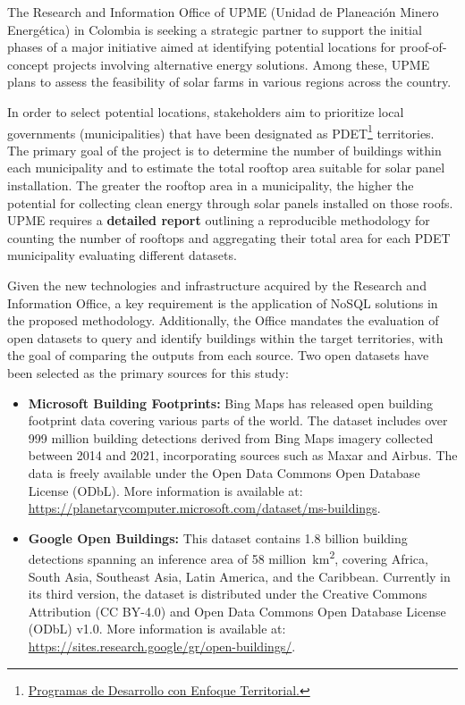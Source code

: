 \documentclass[12pt]{article}
\begin{document}
The Research and Information Office of UPME (Unidad de Planeación Minero Energética) in Colombia is seeking a strategic partner to support the initial phases of a major initiative aimed at identifying potential locations for proof-of-concept projects involving alternative energy solutions. Among these, UPME plans to assess the feasibility of solar farms in various regions across the country.

In order to select potential locations, stakeholders aim to prioritize local governments (municipalities) that have been designated as PDET\footnote{\href{https://centralpdet.renovacionterritorio.gov.co/conoce-los-pdet/}{Programas de Desarrollo con Enfoque Territorial.}} territories. The primary goal of the project is to determine the number of buildings within each municipality and to estimate the total rooftop area suitable for solar panel installation. The greater the rooftop area in a municipality, the higher the potential for collecting clean energy through solar panels installed on those roofs. UPME requires a \textbf{detailed report} outlining a reproducible methodology for counting the number of rooftops and aggregating their total area for each PDET municipality evaluating different datasets.

Given the new technologies and infrastructure acquired by the Research and Information Office, a key requirement is the application of NoSQL solutions in the proposed methodology. Additionally, the Office mandates the evaluation of open datasets to query and identify buildings within the target territories, with the goal of comparing the outputs from each source. Two open datasets have been selected as the primary sources for this study:

\begin{itemize}
  \item \textbf{Microsoft Building Footprints:} Bing Maps has released open building footprint data covering various parts of the world. The dataset includes over 999 million building detections derived from Bing Maps imagery collected between 2014 and 2021, incorporating sources such as Maxar and Airbus. The data is freely available under the Open Data Commons Open Database License (ODbL). More information is available at: \url{https://planetarycomputer.microsoft.com/dataset/ms-buildings}.

  \item \textbf{Google Open Buildings:} This dataset contains 1.8 billion building detections spanning an inference area of 58 million~km\textsuperscript{2}, covering Africa, South Asia, Southeast Asia, Latin America, and the Caribbean. Currently in its third version, the dataset is distributed under the Creative Commons Attribution (CC BY-4.0) and Open Data Commons Open Database License (ODbL) v1.0. More information is available at: \url{https://sites.research.google/gr/open-buildings/}.
\end{itemize}
\end{document}
